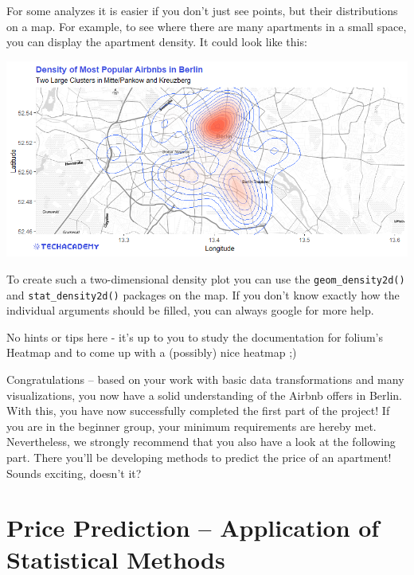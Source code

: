 \documentclass[
  11pt,
]{book}
\newenvironment{tips}[1]
  {
  \begin{itemize}
  \footnotesize
  \renewcommand{\labelitemi}{
    \raisebox{-.7\height}[0pt][0pt]{
      {\setkeys{Gin}{width=3em,keepaspectratio}
        \texttt{[image: images/\#1.png]}}
    }
  }
  \setlength{\fboxsep}{1em}
  \begin{rbox}
  \item
  }
  {
  \end{rbox}
  \end{itemize}
  }
\newenvironment{tipsp}[1]
  {
  \begin{itemize}
  \footnotesize
  \renewcommand{\labelitemi}{
    \raisebox{-.7\height}[0pt][0pt]{
      {\setkeys{Gin}{width=3em,keepaspectratio}
        \texttt{[image: images/\#1.png]}}
    }
  }
  \setlength{\fboxsep}{1em}
  \begin{pbox}
  \item
  }
  {
  \end{pbox}
  \end{itemize}
  }
\begin{document}
For some analyzes it is easier if you don't just see points, but their distributions on a map. For example, to see where there are many apartments in a small space, you can display the apartment density. It could look like this:

\begin{center}\includegraphics[width=1\linewidth]{plot/4_3_map_top200_density} \end{center}

\begin{tips}r

To create such a two-dimensional density plot you can use the \texttt{geom\_density2d()} and \texttt{stat\_density2d()} packages on the map. If you don't know exactly how the individual arguments should be filled, you can always google for more help.

\end{tips}

\begin{tipsp}p

No hints or tips here - it's up to you to study the documentation for folium's Heatmap and to come up with a (possibly) nice heatmap ;)

\end{tipsp}

Congratulations -- based on your work with basic data transformations and many visualizations, you now have a solid understanding of the Airbnb offers in Berlin. With this, you have now successfully completed the first part of the project! If you are in the beginner group, your minimum requirements are hereby met. Nevertheless, we strongly recommend that you also have a look at the following part. There you'll be developing methods to predict the price of an apartment! Sounds exciting, doesn't it?

\newpage

\hypertarget{price-prediction-application-of-statistical-methods}{%
\chapter{Price Prediction -- Application of Statistical Methods}\label{price-prediction-application-of-statistical-methods}}
\end{document}

